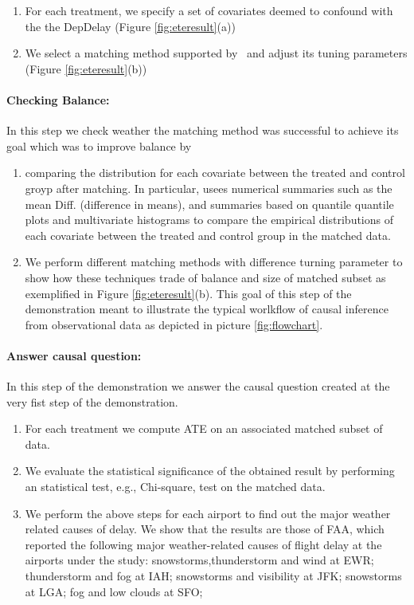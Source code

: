      \begin{enumerate}
      \item For each treatment, we specify a set of covariates deemed to confound with the the DepDelay (Figure \ref{fig:eteresult}(a))
      \item We select a matching method supported by \GSQL\ and adjust its tuning parameters (Figure \ref{fig:eteresult}(b))
\end{enumerate}

\paragraph{\bf Checking Balance:}  In this step we check weather the matching method was successful to achieve its goal which was to improve balance by
    \begin{enumerate}
      \item comparing the distribution for each covariate between the treated and control groyp after matching. In particular, usees numerical summaries such as the mean Diff. (difference in means), and summaries based on quantile quantile plots and multivariate histograms to compare the empirical distributions of each covariate between the treated and control group in the matched data.

      \item We perform different matching methods with difference turning parameter to show how these techniques trade of balance and size of matched subset as exemplified in Figure \ref{fig:eteresult}(b).
      This goal of this step of the demonstration meant to illustrate the typical worlkflow of causal inference from observational data as depicted in picture \ref{fig:flowchart}.

    \end{enumerate}
     \paragraph{\bf Answer causal question:} In this step of the demonstration we answer the causal question created at the very fist step of the demonstration.

       \begin{enumerate}
       \item For each treatment we compute ATE on an associated matched subset of data.
      \item We evaluate the statistical significance of the obtained result by performing an statistical test, e.g., Chi-square, test on the matched data.
    \item We perform the above steps for each airport to find out the major weather related causes of delay.  We show that the results are those of
FAA, which reported the following major weather-related
causes of flight delay at the airports under the study:
snowstorms,thunderstorm and wind at EWR; thunderstorm and fog at IAH;
snowstorms and visibility at JFK; snowstorms at LGA; fog and low
clouds at SFO;

    \end{enumerate}

